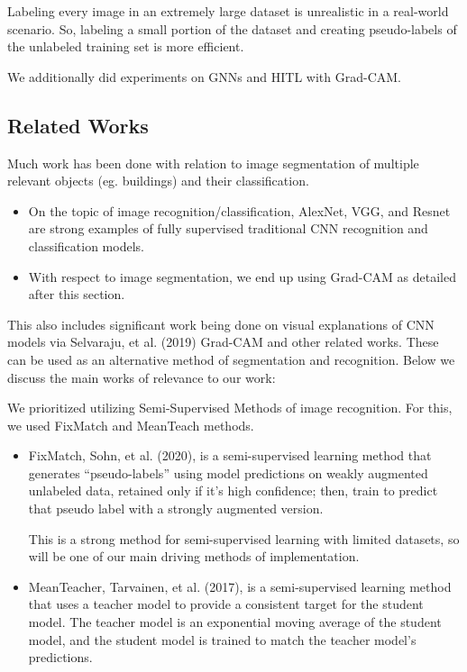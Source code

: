 \documentclass{article}
\begin{document}
Labeling every image in an extremely large dataset is unrealistic in a real-world scenario. So, labeling a small portion of the dataset and creating pseudo-labels of the unlabeled training set is more efficient.

We additionally did experiments on GNNs and HITL with Grad-CAM.

\subsection{Related Works}

Much work has been done with relation to image segmentation of multiple relevant objects (eg. buildings) and their classification.

\begin{itemize}
    \item On the topic of image recognition/classification, AlexNet, VGG, and Resnet\cite{krizhevsky}\cite{simonyan}\cite{he} are strong examples of fully supervised traditional CNN recognition and classification models. 
    \item With respect to image segmentation, we end up using Grad-CAM as detailed after this section.
\end{itemize}

This also includes significant work being done on visual explanations of CNN models via Selvaraju, et al.\cite{selvaraju} (2019) Grad-CAM and other related works. These can be used as an alternative method of segmentation and recognition. Below we discuss the main works of relevance to our work:

We prioritized utilizing Semi-Supervised Methods of image recognition. For this, we used FixMatch and MeanTeach methods. 

\begin{itemize}
    \item FixMatch, Sohn, et al.\cite{sohn} (2020), is a semi-supervised learning method that generates “pseudo-labels” using model predictions on weakly augmented unlabeled data, retained only if it’s high confidence; then, train to predict that pseudo label with a strongly augmented version.

    This is a strong method for semi-supervised learning with limited datasets, so will be one of our main driving methods of implementation.
    \item MeanTeacher, Tarvainen, et al.\cite{tarvainen} (2017), is a semi-supervised learning method that uses a teacher model to provide a consistent target for the student model. The teacher model is an exponential moving average of the student model, and the student model is trained to match the teacher model’s predictions.
\end{itemize}
\end{document}
